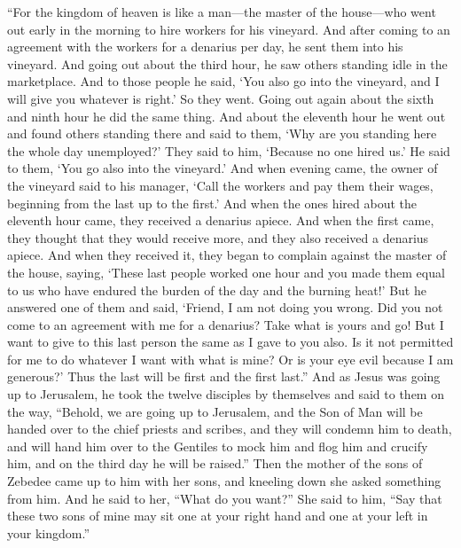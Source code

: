 \begin{biblechapter} %
 “For the kingdom of heaven is like a man—the master of the house—who went out early in the morning to hire workers for his vineyard.
\verse And after coming to an agreement with the workers for a denarius per day, he sent them into his vineyard.
\verse And going out about the third hour, he saw others standing idle in the marketplace.
\verse And to those people he said, ‘You also go into the vineyard, and I will give you whatever is right.’
\verse So they went. Going out again about the sixth and ninth hour he did the same thing.
\verse And about the eleventh hour he went out and found others standing there and said to them, ‘Why are you standing here the whole day unemployed?’
\verse They said to him, ‘Because no one hired us.’ He said to them, ‘You go also into the vineyard.’
\verse And when evening came, the owner of the vineyard said to his manager, ‘Call the workers and pay them their wages, beginning from the last up to the first.’
\verse And when the ones hired about the eleventh hour came, they received a denarius apiece.
\verse And when the first came, they thought that they would receive more, and they also received a denarius apiece.
\verse And when they received it, they began to complain against the master of the house,
\verse saying, ‘These last people worked one hour and you made them equal to us who have endured the burden of the day and the burning heat!’
\verse But he answered one of them and said, ‘Friend, I am not doing you wrong. Did you not come to an agreement with me for a denarius?
\verse Take what is yours and go! But I want to give to this last person the same as I gave to you also.
\verse Is it not permitted for me to do whatever I want with what is mine? Or is your eye evil because I am generous?’
\verse Thus the last will be first and the first last.”
 And as Jesus was going up to Jerusalem, he took the twelve disciples by themselves and said to them on the way,
\verse “Behold, we are going up to Jerusalem, and the Son of Man will be handed over to the chief priests and scribes, and they will condemn him to death,
\verse and will hand him over to the Gentiles to mock him and flog him and crucify him, and on the third day he will be raised.”
 Then the mother of the sons of Zebedee came up to him with her sons, and kneeling down she asked something from him.
\verse And he said to her, “What do you want?” She said to him, “Say that these two sons of mine may sit one at your right hand and one at your left in your kingdom.”

\end{biblechapter}
